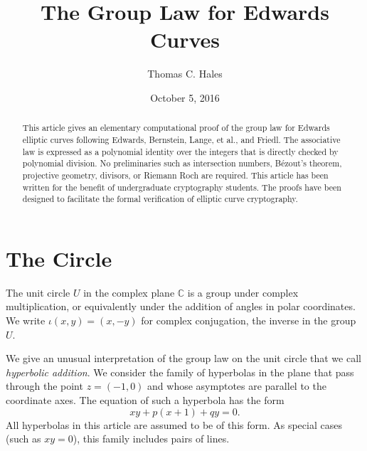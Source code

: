 \documentclass[18pt]{article}
\title{The Group Law for Edwards Curves}
\author{Thomas C. Hales}
\date{October 5, 2016}
\newcommand{\ring}[1]{\mathbb{#1}}
\begin{document}
\maketitle

\begin{abstract} 
  This article gives an elementary computational proof of the group
  law for Edwards elliptic curves following Edwards, Bernstein, Lange, et al.,
  and Friedl.  The associative law is expressed as a polynomial
  identity over the integers that is directly checked by polynomial division.
  No preliminaries such as intersection numbers, 
  B\'ezout's theorem, projective geometry, divisors,
  or Riemann Roch are required. This article has been written for the benefit
  of undergraduate cryptography students.  The proofs have been designed
  to facilitate the formal verification of elliptic curve cryptography.
\end{abstract}

\baselineskip

\newenvironment{blockquote}{%
  \par%
  \medskip%
  \baselineskip=0.7\baselineskip%
  \leftskip=2em\rightskip=2em%
  \noindent\ignorespaces}{%
  \par\medskip}


\section{The Circle}

The unit circle $U$ in the complex plane $\ring{C}$ is a group under
complex multiplication, or equivalently under the addition of angles in polar coordinates.  
We write $\iota(x,y) =
(x,-y)$ for complex conjugation, the inverse in the group
$U$.

We give an unusual interpretation of the group law on the unit circle
that we call {\it hyperbolic addition}.  We consider the family of
hyperbolas in the plane that pass through the point $z=(-1,0)$ and
whose asymptotes are parallel to the coordinate axes.  The equation of
such a hyperbola has the form
\begin{equation}\label{eqn:hyp}
x y + p (x+1) + q y = 0.
\end{equation}
All hyperbolas in this article are assumed to be of this form.
  As special cases (such as $x y=0$), this family includes pairs of lines.
  
\end{document}
